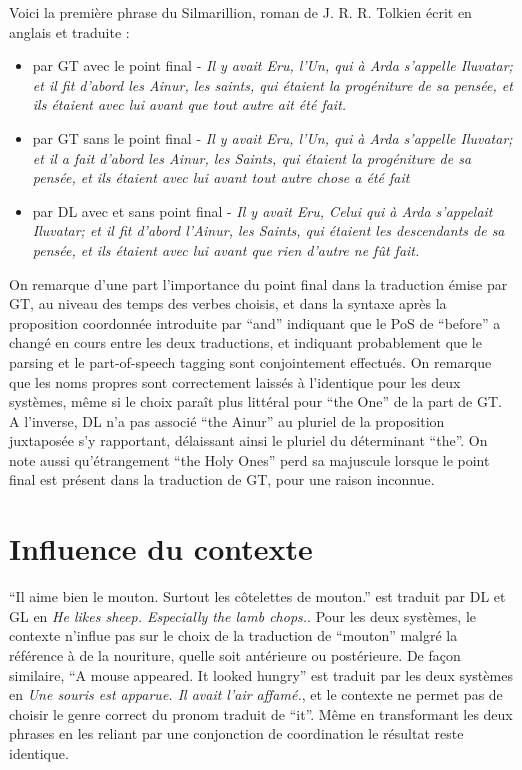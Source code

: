 \documentclass[12pt,a4paper,onecolumn]{article}
\begin{document}
Voici la première phrase du Silmarillion, roman de J. R. R. Tolkien écrit en anglais et traduite :
\begin{itemize}
	\item par GT avec le point final - \textit{Il y avait Eru, l'Un, qui à Arda s'appelle Iluvatar; et il fit d'abord les Ainur, les saints, qui étaient la progéniture de sa pensée, et ils étaient avec lui avant que tout autre ait été fait.}
	\item par GT sans le point final - \textit{Il y avait Eru, l'Un, qui à Arda s'appelle Iluvatar; et il a fait d'abord les Ainur, les Saints, qui étaient la progéniture de sa pensée, et ils étaient avec lui avant tout autre chose a été fait}
	\item par DL avec et sans point final - \textit{Il y avait Eru, Celui qui à Arda s'appelait Iluvatar; et il fit d'abord l'Ainur, les Saints, qui étaient les descendants de sa pensée, et ils étaient avec lui avant que rien d'autre ne fût fait.}
\end{itemize}
On remarque d'une part l'importance du point final dans la traduction émise par GT, au niveau des temps des verbes choisis, et dans la syntaxe après la proposition coordonnée introduite par \enquote{and} indiquant que le PoS de \enquote{before} a changé en cours entre les deux traductions, et indiquant probablement que le parsing et le part-of-speech tagging sont conjointement effectués.
On remarque que les noms propres sont correctement laissés à l'identique pour les deux systèmes, même si le choix paraît plus littéral pour \enquote{the One} de la part de GT. A l'inverse, DL n'a pas associé \enquote{the Ainur} au pluriel de la proposition juxtaposée s'y rapportant, délaissant ainsi le pluriel du déterminant \enquote{the}. On note aussi qu'étrangement \enquote{the Holy Ones} perd sa majuscule lorsque le point final est présent dans la traduction de GT, pour une raison inconnue.

\section{Influence du contexte}

\enquote{Il aime bien le mouton. Surtout les côtelettes de mouton.} est traduit par DL et GL en \textit{He likes sheep. Especially the lamb chops.}. Pour les deux systèmes, le contexte n'influe pas sur le choix de la traduction de \enquote{mouton} malgré la référence à de la nouriture, quelle soit antérieure ou postérieure. De façon similaire, \enquote{A mouse appeared. It looked hungry} est traduit par les deux systèmes en \textit{Une souris est apparue. Il avait l'air affamé.}, et le contexte ne permet pas de choisir le genre correct du pronom traduit de \enquote{it}. Même en transformant les deux phrases en les reliant par une conjonction de coordination le résultat reste identique.
\end{document}
